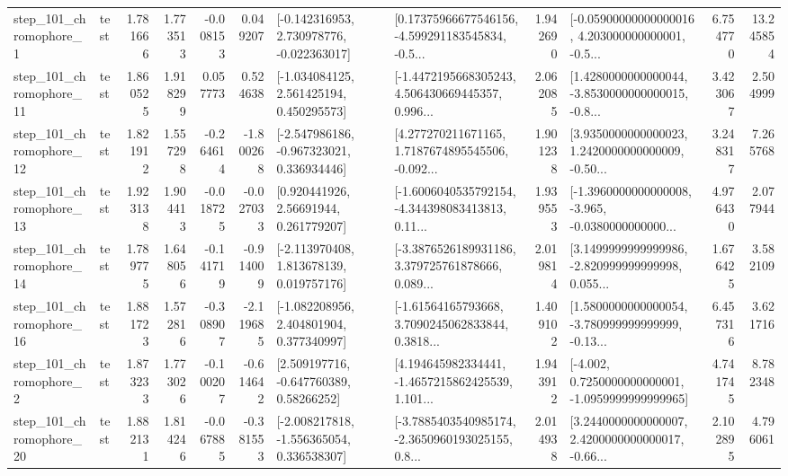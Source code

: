\begin{tabular}{llrrrrllrlrr}
   step\_101\_chromophore\_1 &      test &      1.781666 &    1.773513 &     -0.008153 &  0.049207 &   [-0.142316953, 2.730978776, -0.022363017] &  [0.17375966677546156, -4.599291183545834, -0.5... &       1.942690 &  [-0.05900000000000016, 4.203000000000001, -0.5... &            6.754770 &         13.245854 \\
  step\_101\_chromophore\_11 &      test &      1.860525 &    1.918299 &      0.057773 &  0.524638 &    [-1.034084125, 2.561425194, 0.450295573] &  [-1.4472195668305243, 4.506430669445357, 0.996... &       2.062085 &  [1.4280000000000044, -3.8530000000000015, -0.8... &            3.423067 &          2.504999 \\
  step\_101\_chromophore\_12 &      test &      1.821912 &    1.557298 &     -0.264614 & -1.800268 &   [-2.547986186, -0.967323021, 0.336934446] &  [4.277270211671165, 1.7187674895545506, -0.092... &       1.901238 &  [3.9350000000000023, 1.2420000000000009, -0.50... &            3.248317 &          7.265768 \\
  step\_101\_chromophore\_13 &      test &      1.923138 &    1.904413 &     -0.018725 & -0.027033 &      [0.920441926, 2.56691944, 0.261779207] &  [-1.6006040535792154, -4.344398083413813, 0.11... &       1.939553 &  [-1.3960000000000008, -3.965, -0.0380000000000... &            4.976430 &          2.077944 \\
  step\_101\_chromophore\_14 &      test &      1.789775 &    1.648056 &     -0.141719 & -0.914009 &    [-2.113970408, 1.813678139, 0.019757176] &  [-3.3876526189931186, 3.379725761878666, 0.089... &       2.019814 &  [3.1499999999999986, -2.820999999999998, 0.055... &            1.676425 &          3.582109 \\
  step\_101\_chromophore\_16 &      test &      1.881723 &    1.572816 &     -0.308907 & -2.119685 &    [-1.082208956, 2.404801904, 0.377340997] &  [-1.61564165793668, 3.7090245062833844, 0.3818... &       1.409102 &  [1.5800000000000054, -3.780999999999999, -0.13... &            6.457316 &          3.621716 \\
   step\_101\_chromophore\_2 &      test &      1.873233 &    1.773026 &     -0.100207 & -0.614642 &     [2.509197716, -0.647760389, 0.58266252] &  [4.194645982334441, -1.4657215862425539, 1.101... &       1.943912 &  [-4.002, 0.7250000000000001, -1.0959999999999965] &            4.741745 &          8.782348 \\
  step\_101\_chromophore\_20 &      test &      1.882131 &    1.814246 &     -0.067885 & -0.381553 &   [-2.008217818, -1.556365054, 0.336538307] &  [-3.7885403540985174, -2.3650960193025155, 0.8... &       2.014938 &  [3.2440000000000007, 2.4200000000000017, -0.66... &            2.102895 &          4.796061 \\

\end{tabular}
